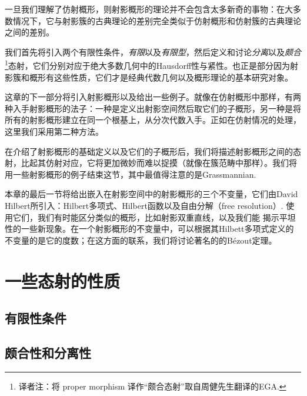 一旦我们理解了仿射概形，则射影概形的理论并不会包含太多新奇的事物：在大多数情况下，它与射影簇的古典理论的差别完全类似于仿射概形和仿射簇的古典理论之间的差别。

我们首先将引入两个有限性条件，\textit{有限}以及\textit{有限型}，然后定义和讨论\textit{分离}以及\textit{颇合}\footnote{译者注：将 proper morphism 译作“颇合态射”取自周健先生翻译的EGA.}态射，它们分别对应于绝大多数几何中的Hausdorff性与紧性。也正是部分因为射影簇和概形有这些性质，它们才是经典代数几何以及概形理论的基本研究对象。

这章的下一部分将引入射影概形以及给出一些例子。就像在仿射概形中那样，有两种入手射影概形的法子：一种是定义出射影空间然后取它们的子概形，另一种是将所有的射影概形建立在同一个根基上，从分次代数入手。正如在仿射情况的处理，这里我们采用第二种方法。

在介绍了射影概形的基础定义以及它们的子概形后，我们将描述射影概形之间的态射，比起其仿射对应，它将更加微妙而难以捉摸（就像在簇范畴中那样）。我们将用一些射影概形的例子结束这节，其中最值得注意的是Grassmannian.

本章的最后一节将给出嵌入在射影空间中的射影概形的三个不变量，它们由David Hilbert所引入：Hilbert多项式、Hilbert函数以及自由分解（free resolution）. 使用它们，我们有时能区分类似的概形，比如射影双重直线，以及我们能
揭示平坦性的一些新现象。在一个射影概形的不变量中，可以根据其Hilbett多项式定义的不变量的是它的度数；在这方面的联系，我们将讨论著名的的B\'{e}zout定理。

\section{一些态射的性质}

\subsection{有限性条件}

\subsection{颇合性和分离性}